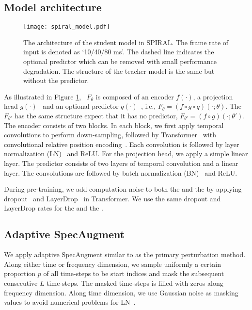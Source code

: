 \subsection{Model architecture}

\begin{figure}[th]
   \centering
   \texttt{[image: spiral\_model.pdf]}
   \caption{The architecture of the student model in SPIRAL. The frame rate of input is denoted as `10/40/80 ms'. The dashed line indicates the optional predictor which can be removed with small performance degradation. The structure of the teacher model is the same but without the predictor.}
   \label{fig:spiral_model}
\end{figure}

As illustrated in Figure \ref{fig:spiral_model}, \student\ $F_\theta$ is composed of an encoder $f(\cdot)$, a projection head $g(\cdot)$~\citep{chen2020simple} and an optional predictor $q(\cdot)$~\citep{Grill2020}, i.e., $F_\theta = (f\circ g\circ q)(\cdot;\theta)$. The \teacher\ $F_{\theta'}$ has the same structure expect that it has no predictor, $F_{\theta'} = (f\circ g)(\cdot;\theta') $.
The encoder consists of two blocks. In each block, we first apply temporal convolutions to perform down-sampling, followed by Transformer~\citep{NIPS2017_3f5ee243} with convolutional relative position encoding~\citep{wav2vec2}. Each convolution is followed by layer normalization (LN)~\citep{ba2016layer} and ReLU.
For the projection head, we apply a simple linear layer.
The predictor consists of two layers of temporal convolution and a linear layer. The convolutions are followed by batch normalization (BN)~\citep{batchnorm} and ReLU. 

During pre-training, we add computation noise to both the \student{} and the \teacher{} by applying dropout~\citep{srivastava2014dropout} and LayerDrop~\citep{fan2019reducing} in Transformer. We use the same dropout and LayerDrop rates for the \student{} and the \teacher{}.

\subsection{Adaptive SpecAugment}

We apply adaptive SpecAugment similar to \citet{large_scale_spec_aug} as the primary perturbation method.
Along either time or frequency dimension, we sample uniformly a certain proportion $p$ of all time-steps to be start indices and mask the subsequent consecutive $L$ time-steps.
The masked time-steps is filled with zeros along frequency dimension. Along time dimension, we use Gaussian noise as masking values to avoid numerical problems for LN~\citep{large_scale_spec_aug}.


